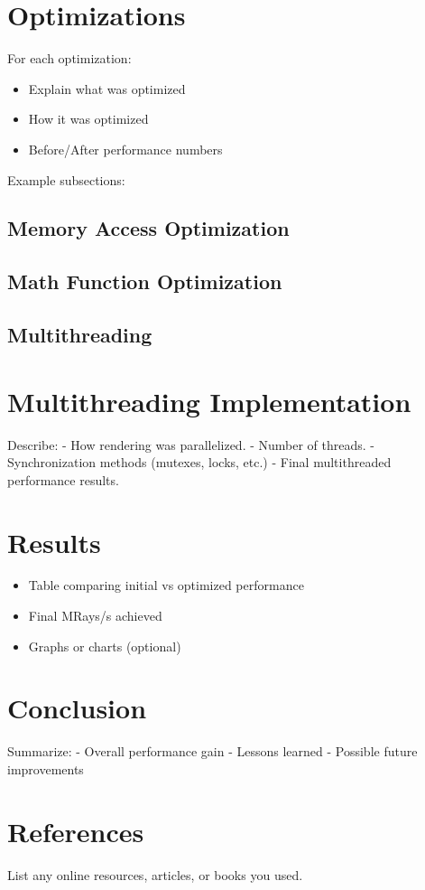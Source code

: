 \documentclass{article}
\begin{document}
\section{Optimizations}
For each optimization:
\begin{itemize}
    \item Explain what was optimized
    \item How it was optimized
    \item Before/After performance numbers
\end{itemize}

Example subsections:
\subsection{Memory Access Optimization}
\subsection{Math Function Optimization}
\subsection{Multithreading}

\section{Multithreading Implementation}
Describe:
- How rendering was parallelized.
- Number of threads.
- Synchronization methods (mutexes, locks, etc.)
- Final multithreaded performance results.

\section{Results}
\begin{itemize}
    \item Table comparing initial vs optimized performance
    \item Final MRays/s achieved
    \item Graphs or charts (optional)
\end{itemize}

\section{Conclusion}
Summarize:
- Overall performance gain
- Lessons learned
- Possible future improvements

\section{References}
List any online resources, articles, or books you used.
\end{document}
